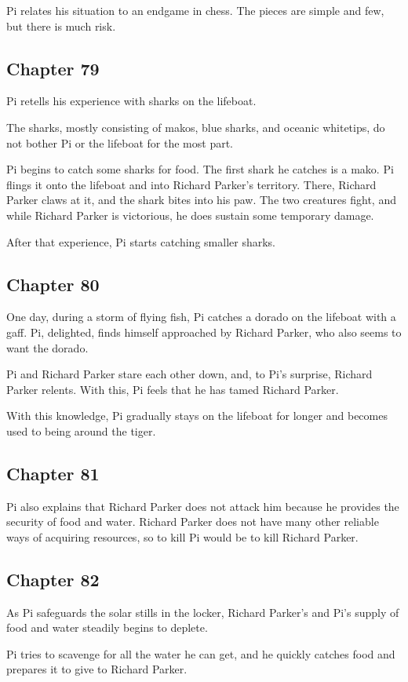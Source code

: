 \documentclass[11pt]{article}
\begin{document}
Pi relates his situation to an endgame in chess. The pieces are simple and few, but there is much risk.
\subsection{Chapter 79}
\label{sec:orgff5d67f}
Pi retells his experience with sharks on the lifeboat.

The sharks, mostly consisting of makos, blue sharks, and oceanic whitetips, do not bother Pi or the lifeboat for the most part.

Pi begins to catch some sharks for food. The first shark he catches is a mako. Pi flings it onto the lifeboat and into Richard Parker's territory. There, Richard Parker claws at it, and the shark bites into his paw. The two creatures fight, and while Richard Parker is victorious, he does sustain some temporary damage.

After that experience, Pi starts catching smaller sharks.
\subsection{Chapter 80}
\label{sec:orgb9ba21f}
One day, during a storm of flying fish, Pi catches a dorado on the lifeboat with a gaff. Pi, delighted, finds himself approached by Richard Parker, who also seems to want the dorado.

Pi and Richard Parker stare each other down, and, to Pi's surprise, Richard Parker relents. With this, Pi feels that he has tamed Richard Parker.

With this knowledge, Pi gradually stays on the lifeboat for longer and becomes used to being around the tiger.
\subsection{Chapter 81}
\label{sec:org15c3cc5}
Pi also explains that Richard Parker does not attack him because he provides the security of food and water. Richard Parker does not have many other reliable ways of acquiring resources, so to kill Pi would be to kill Richard Parker.
\subsection{Chapter 82}
\label{sec:orgcfc36c6}
As Pi safeguards the solar stills in the locker, Richard Parker's and Pi's supply of food and water steadily begins to deplete.

Pi tries to scavenge for all the water he can get, and he quickly catches food and prepares it to give to Richard Parker.
\end{document}
